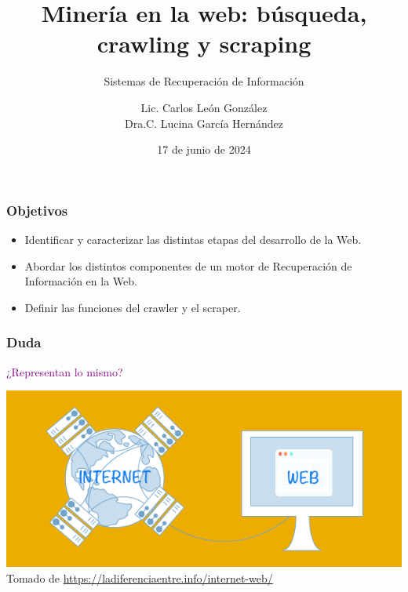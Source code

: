\documentclass[
10pt, %
aspectratio=169, %
]{beamer}
\title[Short Title]{Minería en la web: búsqueda, crawling y scraping}
\subtitle{Sistemas de Recuperación de Información}
\author{Lic. Carlos León González \\ Dra.C. Lucina García Hernández}
\institute[UC]{Facultad de Matem\'atica y Computaci\'on \\ Universidad de La Habana \\ \smallskip }
\date{17 de junio de  2024} %
\begin{document}
	
	
	
	\begin{frame}
		\titlepage
	\end{frame}
	
	\begin{frame}
		
		\frametitle{Objetivos}
		
		\begin{itemize}

			\item Identificar y caracterizar las distintas etapas del desarrollo de la Web.
			
			\item Abordar los distintos componentes de un motor de Recuperación de Información en la Web.
			
			\item Definir las funciones del crawler y el scraper.
						
		\end{itemize}
		
	\end{frame}
	
	\begin{frame}
		
		\frametitle{Duda}
		
		\centering 
		
		\textcolor{purple}{
			¿Representan lo mismo?
		} 
		
		\vspace{1\baselineskip}
		
		\includegraphics[scale=0.5]{internet-web.png} \\[2mm]
		
		{\scriptsize Tomado de \url{https://ladiferenciaentre.info/internet-web/}}
		
	\end{frame}
	
\end{document}
